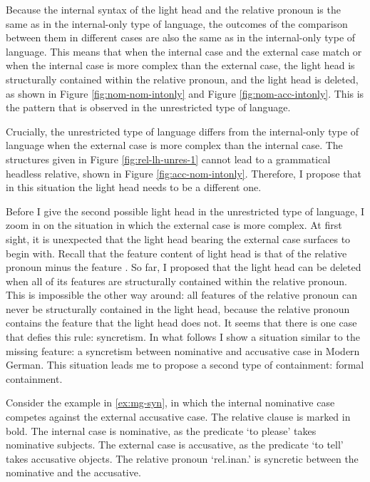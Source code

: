 Because the internal syntax of the light head and the relative pronoun is the same as in the internal-only type of language, the outcomes of the comparison between them in different cases are also the same as in the internal-only type of language. This means that when the internal case and the external case match or when the internal case is more complex than the external case, the light head is structurally contained within the relative pronoun, and the light head is deleted, as shown in Figure \ref{fig:nom-nom-intonly} and Figure \ref{fig:nom-acc-intonly}. This is the pattern that is observed in the unrestricted type of language.

Crucially, the unrestricted type of language differs from the internal-only type of language when the external case is more complex than the internal case. The structures given in Figure \ref{fig:rel-lh-unres-1} cannot lead to a grammatical headless relative, shown in Figure \ref{fig:acc-nom-intonly}. Therefore, I propose that in this situation the light head needs to be a different one.

Before I give the second possible light head in the unrestricted type of language, I zoom in on the situation in which the external case is more complex. At first sight, it is unexpected that the light head bearing the external case surfaces to begin with. Recall that the feature content of light head is that of the relative pronoun minus the feature .
So far, I proposed that the light head can be deleted when all of its features are structurally contained within the relative pronoun. This is impossible the other way around: all features of the relative pronoun can never be structurally contained in the light head, because the relative pronoun contains the feature  that the light head does not. It seems that there is one case that defies this rule: syncretism.
In what follows I show a situation similar to the missing  feature: a syncretism between nominative and accusative case in Modern German. This situation leads me to propose a second type of containment: formal containment.

Consider the example in \ref{ex:mg-syn}, in which the internal nominative case competes against the external accusative case. The relative clause is marked in bold.
The internal case is nominative, as the predicate  `to please' takes nominative subjects.
The external case is accusative, as the predicate  `to tell' takes accusative objects.
The relative pronoun  `\ac{rel}.\ac{inan}.' is syncretic between the nominative and the accusative.

